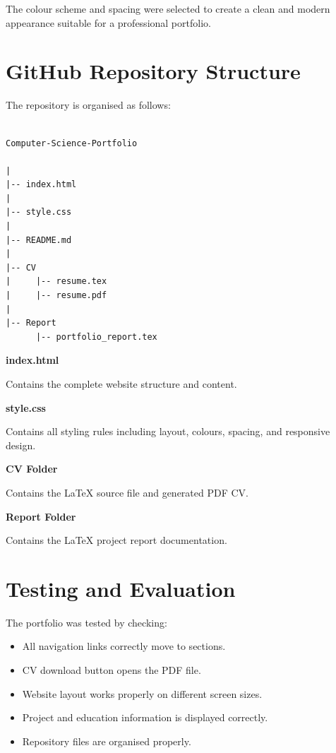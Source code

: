 \documentclass[12pt,a4paper]{article}
\begin{document}
The colour scheme and spacing were selected to create a clean and modern appearance suitable for a professional portfolio.



\section{GitHub Repository Structure}


The repository is organised as follows:


\begin{verbatim}

Computer-Science-Portfolio

|
|-- index.html
|
|-- style.css
|
|-- README.md
|
|-- CV
|     |-- resume.tex
|     |-- resume.pdf
|
|-- Report
      |-- portfolio_report.tex

\end{verbatim}



\textbf{index.html}

Contains the complete website structure and content.



\textbf{style.css}

Contains all styling rules including layout, colours, spacing, and responsive design.



\textbf{CV Folder}

Contains the LaTeX source file and generated PDF CV.



\textbf{Report Folder}

Contains the LaTeX project report documentation.





\section{Testing and Evaluation}


The portfolio was tested by checking:


\begin{itemize}

\item All navigation links correctly move to sections.

\item CV download button opens the PDF file.

\item Website layout works properly on different screen sizes.

\item Project and education information is displayed correctly.

\item Repository files are organised properly.

\end{itemize}
\end{document}
